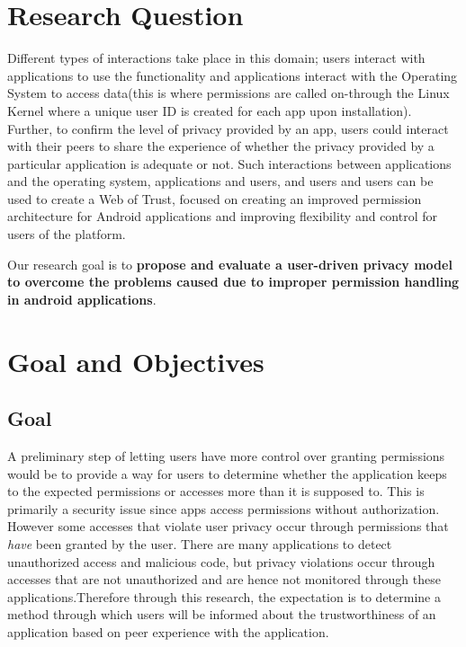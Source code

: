 \section{Research Question}

Different types of interactions take place in this domain; users interact with applications to use the functionality and applications interact with the Operating System to access data(this is where permissions are called on-through the Linux Kernel where a unique user ID is created for each app upon installation). Further, to confirm the level of privacy provided by an app, users could interact with their peers to share the experience of whether the privacy provided by a particular application is adequate or not. Such interactions between applications and the operating system, applications and users, and users and users can be used to create a Web of Trust, focused on creating an improved permission architecture for Android applications and improving flexibility and control for users of the platform. 
\smallskip

Our research goal is to \textbf{propose and evaluate a user-driven privacy model to overcome the problems caused due to improper permission handling in android applications}. 

\section{Goal and Objectives}
\subsection{Goal}
A preliminary step of letting users have more control over granting permissions would be to provide a way for users to determine whether the application keeps to the expected permissions or accesses more than it is supposed to. This is primarily a security issue since apps access permissions without authorization. However some accesses that violate user privacy occur through permissions that \textit{have} been granted by the user. There are many applications to detect unauthorized access and malicious code, but privacy violations occur through accesses that are not unauthorized and are hence not monitored through these applications.Therefore through this research, the expectation is to determine a method through which users will be informed about the trustworthiness of an application based on peer experience with the application.

